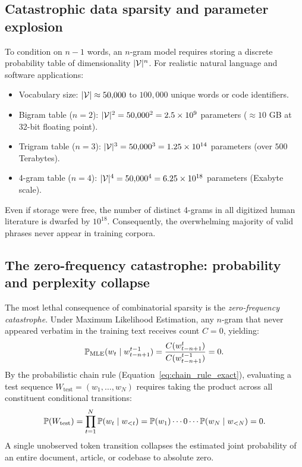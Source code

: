 \documentclass[../../main.tex]{subfiles}
\begin{document}
\subsection{Catastrophic data sparsity and parameter explosion}
To condition on $n-1$ words, an $n$-gram model requires storing a discrete probability table of dimensionality $|\mathcal{V}|^n$. For realistic natural language and software applications:
\begin{itemize}
    \item Vocabulary size: $|\mathcal{V}| \approx 50{,}000$ to $100{,}000$ unique words or code identifiers.
    \item Bigram table ($n=2$): $|\mathcal{V}|^2 = 50{,}000^2 = 2.5 \times 10^9$ parameters ($\approx 10$ GB at 32-bit floating point).
    \item Trigram table ($n=3$): $|\mathcal{V}|^3 = 50{,}000^3 = 1.25 \times 10^{14}$ parameters (over $500$ Terabytes).
    \item 4-gram table ($n=4$): $|\mathcal{V}|^4 = 50{,}000^4 = 6.25 \times 10^{18}$ parameters (Exabyte scale).
\end{itemize}
Even if storage were free, the number of distinct 4-grams in all digitized human literature is dwarfed by $10^{18}$. Consequently, the overwhelming majority of valid phrases never appear in training corpora.

\subsection{The zero-frequency catastrophe: probability and perplexity collapse}
\label{subsec:zero_freq_collapse}
The most lethal consequence of combinatorial sparsity is the \emph{zero-frequency catastrophe}. Under Maximum Likelihood Estimation, any $n$-gram that never appeared verbatim in the training text receives count $C = 0$, yielding:
\begin{equation}
\label{eq:zero_mle}
\mathbb{P}_{\text{MLE}}(w_t \mid w_{t-n+1}^{t-1}) = \frac{C(w_{t-n+1}^t)}{C(w_{t-n+1}^{t-1})} = 0.
\end{equation}
By the probabilistic chain rule (Equation~\eqref{eq:chain_rule_exact}), evaluating a test sequence $W_{\text{test}} = (w_1, \dots, w_N)$ requires taking the product across all constituent conditional transitions:
\begin{equation}
\label{eq:chain_rule_zero_collapse}
\mathbb{P}(W_{\text{test}}) = \prod_{t=1}^N \mathbb{P}(w_t \mid w_{<t}) = \mathbb{P}(w_1) \cdots 0 \cdots \mathbb{P}(w_N \mid w_{<N}) = 0.
\end{equation}
A single unobserved token transition collapses the estimated joint probability of an entire document, article, or codebase to absolute zero.
\end{document}
